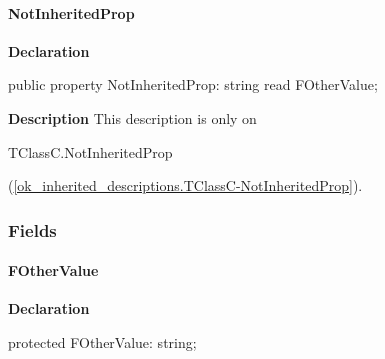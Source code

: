 \documentclass{report}
\begin{document}
\paragraph*{NotInheritedProp}\hspace*{\fill}

\begin{list}{}{
\setlength{\itemindent}{0cm}
\setlength{\listparindent}{0cm}
\setlength{\leftmargin}{\evensidemargin}
\addtolength{\leftmargin}{\tmplength}
\settowidth{\labelsep}{X}
\addtolength{\leftmargin}{\labelsep}
\setlength{\labelwidth}{\tmplength}
}
\begin{flushleft}
\item[\textbf{Declaration}\hfill]
\begin{ttfamily}
public property NotInheritedProp: string read FOtherValue;\end{ttfamily}


\end{flushleft}
\par
\item[\textbf{Description}]
This description is only on \begin{ttfamily}TClassC.NotInheritedProp\end{ttfamily}(\ref{ok_inherited_descriptions.TClassC-NotInheritedProp}).

\end{list}
\subsubsection*{\large{\textbf{Fields}}\normalsize\hspace{1ex}\hfill}
\paragraph*{FOtherValue}\hspace*{\fill}

\begin{list}{}{
\setlength{\itemindent}{0cm}
\setlength{\listparindent}{0cm}
\setlength{\leftmargin}{\evensidemargin}
\addtolength{\leftmargin}{\tmplength}
\settowidth{\labelsep}{X}
\addtolength{\leftmargin}{\labelsep}
\setlength{\labelwidth}{\tmplength}
}
\begin{flushleft}
\item[\textbf{Declaration}\hfill]
\begin{ttfamily}
protected FOtherValue: string;\end{ttfamily}


\end{flushleft}
\end{list}
\end{document}

